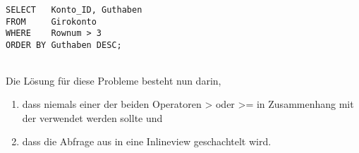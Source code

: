           \begin{lstlisting}[language=oracle_sql,caption={Erneut eine falsche Anwendung der Rownum},label=sql06_13]
SELECT   Konto_ID, Guthaben
FROM     Girokonto
WHERE    Rownum > 3
ORDER BY Guthaben DESC;
          \end{lstlisting}
          \begin{center}
            \begin{small}
              \tablehead{}

              \begin{oraclesql}
                \begin{supertabular}{rr}

                \end{supertabular}
              \end{oraclesql}
            \end{small}
          \end{center}
          Die Lösung für diese Probleme besteht nun darin,
          \begin{enumerate}
            \item dass niemals einer der beiden Operatoren \textgreater{} oder \textgreater = in Zusammenhang mit der  verwendet werden sollte und
            \item dass die Abfrage aus  in eine Inlineview geschachtelt wird.
          \end{enumerate}
